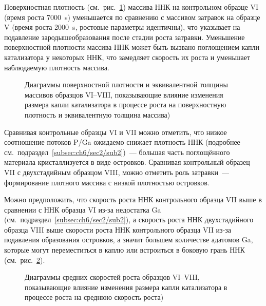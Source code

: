 Поверхностная плотность (см.~рис.~\cref{fig:Image_44_1}) массива ННК на
контрольном образце VI (время роста 7000~\si{\second}) уменьшается по
сравнению с массивом затравок на образце V (время роста 2000~\si{\second},
ростовые параметры идентичны), что указывает на подавление зародышеобразования
после стадии роста затравки. Уменьшение поверхностной плотности массива ННК
может быть вызвано поглощением капли катализатора у некоторых ННК, что
замедляет скорость их роста и уменьшает наблюдаемую плотность массива.

\begin{figure}[ht]   \caption{Диаграммы поверхностной плотности и
		эквивалентной толщины массивов образцов VI--VIII, показывающие влияние
		изменения размера капли катализатора в процессе роста на поверхностную
плотность и эквивалентную толщина массива)}\label{fig:Image_44_1} \end{figure}

Сравнивая контрольные образцы VI и VII можно отметить, что низкое соотношение
потоков P/Ga ожидаемо снижает плотность ННК (подробнее
см.~подраздел~\cref{subsec:ch6/sec2/sub2})~--- большая часть поглощённого
материала кристаллизуется в виде островков. Сравнивая контрольный образец VII
с двухстадийным образцом VIII, можно отметить роль затравки~--- формирование
плотного массива с низкой плотностью островков.

Можно предположить, что скорость роста ННК контрольного образца VII выше в
сравнении с ННК образца VI из-за недостатка Ga
(см.~подраздел~\cref{subsec:ch6/sec2/sub2}), а скорость роста ННК
двухстадийного образца VIII выше скорости роста ННК контрольного образца VII
из-за подавления образования островков, а значит большем количестве адатомов
Ga, которые могут переместиться в каплю или встроиться в боковую грань ННК
(см.~рис.~\cref{fig:Image_44_2}).

\begin{figure}[ht]   \caption{Диаграммы средних скоростей роста образцов
		VI--VIII, показывающие влияние изменения размера капли катализатора в
процессе роста на среднюю скорость роста)}\label{fig:Image_44_2} \end{figure}


